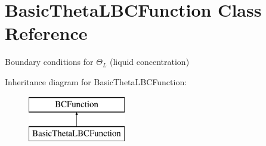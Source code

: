 \hypertarget{class_basic_theta_l_b_c_function}{\section{Basic\-Theta\-L\-B\-C\-Function Class Reference}
\label{class_basic_theta_l_b_c_function}
}


Boundary conditions for $\Theta_L$ (liquid concentration)  


Inheritance diagram for Basic\-Theta\-L\-B\-C\-Function\-:\begin{figure}[H]
\begin{center}
\leavevmode
\includegraphics[height=2.000000cm]{class_basic_theta_l_b_c_function}
\end{center}
\end{figure}
